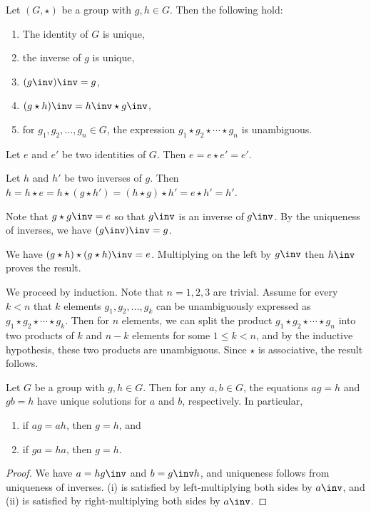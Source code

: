  \label{prop1.1}
Let $(G, \star)$ be a group with $g, h \in G$. Then the following hold:
\begin{enumerate}
    \item The identity of $G$ is unique,
    \item the inverse of $g$ is unique,
    \item $(g\inv)\inv = g$,
    \item $(g \star h)\inv = h\inv \star g\inv$,
    \item for $g_1, g_2, \ldots, g_n \in G$, the expression $g_1 \star g_2 \star \cdots \star g_n$ is unambiguous.
\end{enumerate}
\begin{proofnum}
    \item Let $e$ and $e'$ be two identities of $G$. Then $e = e \star e' = e'$.
    \item Let $h$ and $h'$ be two inverses of $g$. Then $h = h \star e = h \star (g \star h') = (h \star g) \star h' = e \star h' = h'$.
    \item Note that $g \star g\inv = e$ so that $g\inv$ is an inverse of $g\inv$. By the uniqueness of inverses, we have $(g\inv)\inv = g$.
    \item We have $(g \star h) \star (g \star h)\inv = e$. Multiplying on the left by $g\inv$ then $h\inv$ proves the result.
    \item We proceed by induction. Note that $n = 1, 2, 3$ are trivial. Assume for every $k < n$ that $k$ elements $g_1, g_2, \ldots, g_k$ can be unambiguously expressed as $g_1 \star g_2 \star \cdots \star g_k$. Then for $n$ elements, we can split the product $g_1 \star g_2 \star \cdots \star g_n$ into two products of $k$ and $n - k$ elements for some $1 \leq k < n$, and by the inductive hypothesis, these two products are unambiguous. Since $\star$ is associative, the result follows.
\end{proofnum}

 \label{prop1.2}
Let $G$ be a group with $g, h \in G$. Then for any $a, b \in G$, the equations $ag = h$ and $gb = h$ have unique solutions for $a$ and $b$, respectively. In particular,
\begin{enumerate}
    \item if $ag = ah$, then $g = h$, and
    \item if $ga = ha$, then $g = h$.
\end{enumerate}

\begin{proof}
    We have $a = hg\inv$ and $b = g\inv h$, and uniqueness follows from uniqueness of inverses. (i) is satisfied by left-multiplying both sides by $a\inv$, and (ii) is satisfied by right-multiplying both sides by $a\inv$.
\end{proof}

